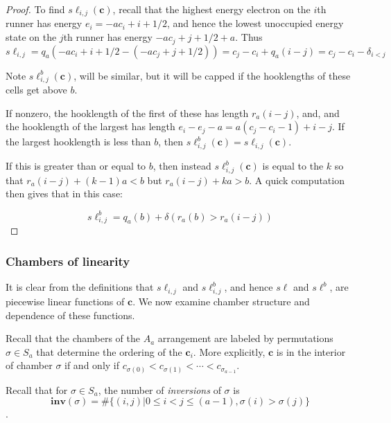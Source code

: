 \documentclass{amsart}[12pt]
\theoremstyle{definition}
\newcommand{\core}{\mathbf{core}}
\newcommand{\sk}{s\ell}
\newcommand{\inv}{\mathbf{inv}}
\begin{document}
\begin{proof}


To find $\sk_{i,j}(\mathbf{c})$, recall that the highest energy electron on the $i$th runner has energy $e_i=-ac_i+i+1/2$, and hence the lowest unoccupied energy state on the $j$th runner has energy $-ac_j+j+1/2+a$.  Thus
$$\sk_{i,j}=q_a(-ac_i+i+1/2-(-ac_j+j+1/2))=c_j-c_i+q_a(i-j)=c_j-c_i-\delta_{i<j}$$

Note $\sk_{i,j}^b(\mathbf{c})$, will be similar, but it will be capped if the hooklengths of these cells get above $b$.

If nonzero, the hooklength of the first of these has length $r_a(i-j)$, and, and the hooklength of the largest has length
$e_i-e_j-a=a(c_j-c_i-1)+i-j$.  If the largest hooklength is less than $b$, then $\sk^b_{i,j}(\mathbf{c})=\sk_{i,j}(\mathbf{c})$.

If this is greater than or equal to $b$, then instead $\sk^b_{i,j}(\mathbf{c})$ is equal to the $k$ so that $r_a(i-j)+(k-1)a<b$ but $r_a(i-j)+ka>b$.  A quick computation then gives that in this case:

$$\sk_{i,j}^b=q_a(b)+\delta(r_a(b)>r_a(i-j))$$


\end{proof}

\subsubsection{Chambers of linearity} It is clear from the definitions that $\sk_{i,j}$ and $\sk_{i,j}^b$, and hence $\sk$ and $\sk^b$, are piecewise linear functions of $\mathbf{c}$.  We now examine chamber structure and dependence of these functions.


Recall that the chambers of the $A_a$ arrangement are labeled by permutations $\sigma\in S_a$ that determine the ordering of the $\mathbf{c}_i$.  More explicitly, $\mathbf{c}$ is in the interior of chamber $\sigma$ if and only if $c_{\sigma(0)}<c_{\sigma(1)}<\cdots<c_{\sigma_{a-1}}$.

Recall that for $\sigma\in S_a$, the number of \emph{inversions} of $\sigma$ is $$\inv(\sigma)=\#\{(i,j)|0\leq i<j\leq (a-1), \sigma(i)>\sigma(j)\}$$.
\end{document}
